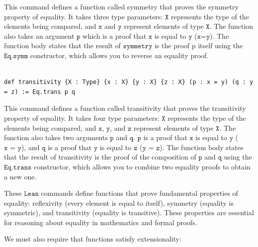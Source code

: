 \documentclass{book}
\newcounter{lcounter}
\begin{document}
This command defines a function called symmetry that proves the symmetry property of equality. It takes three type parameters: $\texttt{X}$ represents the type of the elements being compared, and $\texttt{x}$ and $\texttt{y}$ represent elements of type $\texttt{X}$. The function also takes an argument $\texttt{p}$ which is a proof that $\texttt{x}$ is equal to $\texttt{y}$ ($\texttt{x=y}$). The function body states that the result of $\texttt{symmetry}$ is the proof p itself using the $\texttt{Eq.symm}$ constructor, which allows you to reverse an equality proof.

\begin{center}
\begin{tcolorbox}[width=5in,colback={white},title={\begin{center}\texttt{Lean \thelcounter} \addtocounter{lcounter}{1}  \end{center}},colbacktitle=Blue,coltitle=black]
\begin{verbatim}

def transitivity {X : Type} {x : X} {y : X} {z : X} (p : x = y) (q : y = z) := Eq.trans p q

\end{verbatim}
\end{tcolorbox}
\end{center}

This command defines a function called transitivity that proves the transitivity property of equality. It takes four type parameters: $\texttt{X}$ represents the type of the elements being compared, and $\texttt{x}$, $\texttt{y}$, and $\texttt{z}$ represent elements of type $\texttt{X}$. The function also takes two arguments $\texttt{p}$ and $\texttt{q}$. $\texttt{p}$ is a proof that $\texttt{x}$ is equal to $\texttt{y}$ ($\texttt{x = y}$), and $\texttt{q}$ is a proof that $\texttt{y}$ is equal to $\texttt{z}$ ($\texttt{y = z}$). The function body states that the result of transitivity is the proof of the composition of $\texttt{p}$ and $\texttt{q}$ using the $\texttt{Eq.trans}$ constructor, which allows you to combine two equality proofs to obtain a new one.

These $\texttt{Lean}$ commands define functions that prove fundamental properties of equality: reflexivity (every element is equal to itself), symmetry (equality is symmetric), and transitivity (equality is transitive). These properties are essential for reasoning about equality in mathematics and formal proofs.

We must also require that functions satisfy extensionality:
\end{document}
